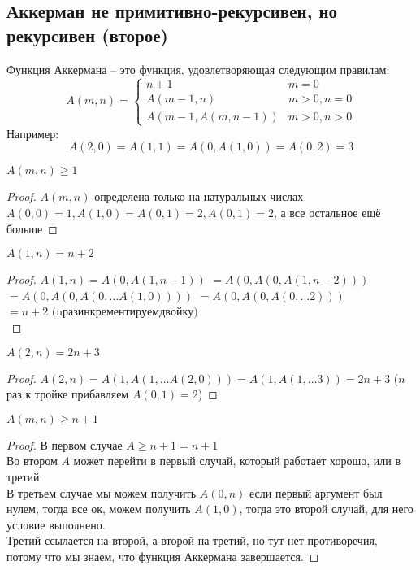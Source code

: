 \subsection{Аккерман не примитивно-рекурсивен, но рекурсивен (второе)}
\label{sec-10-3}
Функция Аккермана -- это функция, удовлетворяющая следующим правилам:
\[
    A(m,n) = \begin{cases}
        n+1 & m = 0\\
        A(m-1,n) & m > 0, n = 0\\
        A(m-1,A(m,n-1)) & m > 0, n > 0
    \end{cases}
\]
Например:
\[A(2, 0) = A(1, 1) = A(0, A(1, 0)) = A(0, 2) = 3\]
\begin{lemma}
$A(m, n) \geq 1$
\end{lemma}
\begin{proof}
$A(m, n)$ определена только на натуральных числах\\
$A(0, 0) = 1, A(1, 0) = A(0, 1) = 2, A(0, 1) = 2$, а все остальное ещё больше
\end{proof}
\begin{lemma}
\label{lemma1a}
$A(1, n) = n + 2$
\end{lemma}
\begin{proof}
$A(1, n) = A(0, A(1, n - 1))$
$= A(0, A(0, A(1, n - 2)))$\\
$= A(0, A(0, A(0, \ldots{} A(1, 0))))$
$= A(0, A(0, A(0, \ldots{} 2)))$\\
$= n + 2$ $ ($n$ раз инкрементируем двойку)$\\
\end{proof}
\begin{lemma}
\label{lemma1b}
$A(2, n) = 2n + 3$
\end{lemma}
\begin{proof}
$A(2, n)
= A(1, A(1, \ldots{} A(2, 0)))
= A(1, A(1, \ldots{} 3))
= 2n + 3$ ($n$ раз к тройке прибавляем $A(0, 1) = 2$)
\end{proof}
\begin{lemma}
\label{lemma2}
$A(m, n) \geq n + 1$
\end{lemma}
\begin{proof}
В первом случае $A \geq n + 1 = n + 1$\\
Во втором $A$ может перейти в первый случай, который работает
хорошо, или в третий.\\
В третьем случае мы можем получить $A(0, n)$ если первый аргумент
был нулем, тогда все ок, можем получить $A(1, 0)$, тогда это второй
случай, для него условие выполнено.\\
Третий ссылается на второй, а второй на третий, но тут
нет противоречия, потому что мы знаем, что функция Аккермана
завершается.
\end{proof}
